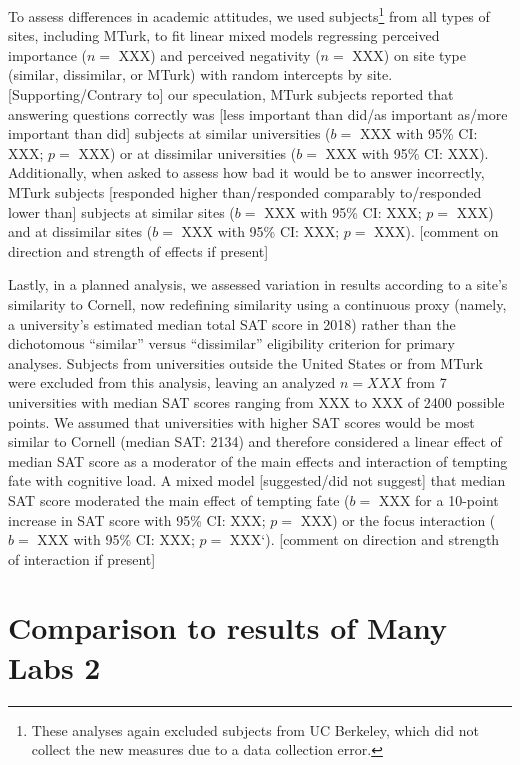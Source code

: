\documentclass[english,floatsintext,man]{apa6}
\theoremstyle{definition}
\theoremstyle{definition}
\theoremstyle{definition}
\theoremstyle{remark}
\begin{document}
To assess differences in academic attitudes, we used subjects\footnote{These
  analyses again excluded subjects from UC Berkeley, which did not
  collect the new measures due to a data collection error.} from all
types of sites, including MTurk, to fit linear mixed models regressing
perceived importance (\(n=\) XXX) and perceived negativity (\(n=\) XXX)
on site type (similar, dissimilar, or MTurk) with random intercepts by
site. {[}Supporting/Contrary to{]} our speculation, MTurk subjects
reported that answering questions correctly was {[}less important than
did/as important as/more important than did{]} subjects at similar
universities (\(b=\) XXX with 95\% CI: XXX; \(p=\) XXX) or at dissimilar
universities (\(b=\) XXX with 95\% CI: XXX). Additionally, when asked to
assess how bad it would be to answer incorrectly, MTurk subjects
{[}responded higher than/responded comparably to/responded lower than{]}
subjects at similar sites (\(b=\) XXX with 95\% CI: XXX; \(p=\) XXX) and
at dissimilar sites (\(b=\) XXX with 95\% CI: XXX; \(p=\) XXX).
{[}comment on direction and strength of effects if present{]}

Lastly, in a planned analysis, we assessed variation in results
according to a site's similarity to Cornell, now redefining similarity
using a continuous proxy (namely, a university's estimated median total
SAT score in 2018) rather than the dichotomous \enquote{similar} versus
\enquote{dissimilar} eligibility criterion for primary analyses.
Subjects from universities outside the United States or from MTurk were
excluded from this analysis, leaving an analyzed \(n = XXX\) from 7
universities with median SAT scores ranging from XXX to XXX of 2400
possible points. We assumed that universities with higher SAT scores
would be most similar to Cornell (median SAT: 2134) and therefore
considered a linear effect of median SAT score as a moderator of the
main effects and interaction of tempting fate with cognitive load. A
mixed model {[}suggested/did not suggest{]} that median SAT score
moderated the main effect of tempting fate (\(b=\) XXX for a 10-point
increase in SAT score with 95\% CI: XXX; \(p=\) XXX) or the focus
interaction (\(b=\) XXX with 95\% CI: XXX; \(p=\) XXX`). {[}comment on
direction and strength of interaction if present{]}

\section{Comparison to results of Many Labs
2}\label{comparison-to-results-of-many-labs-2}
\end{document}
